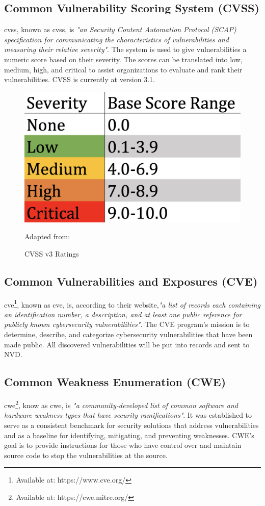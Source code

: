 \subsection{Common Vulnerability Scoring System (CVSS)}
\acrlong{cvss}, known as \acrshort{cvss}, is \textit{"an Security Content Automation Protocol (SCAP) specification for communicating the characteristics of vulnerabilities and measuring their relative severity"}\cite{nistCVSS}. The system is used to give vulnerabilities a numeric score based on their severity. The scores can be translated into low, medium, high, and critical to assist organizations to evaluate and rank their vulnerabilities. CVSS is currently at version 3.1. \cite{CVSS}
\begin{figure}[H]
    \centering
    \includegraphics[scale=0.3]{Images/CVSS.png}
    \caption{CVSS v3 Ratings} Adapted from:\cite{cvssrating}
    \label{fig:CVSS v3 Ratings}
\end{figure}


\subsection{Common Vulnerabilities and Exposures (CVE)}
\acrlong{cve}\footnote{Available at: https://www.cve.org/}, known as \acrshort{cve}, is, according to their website,\textit{"a list of records each containing an identification number, a description, and at least one public reference for publicly known cybersecurity vulnerabilities"}\cite{CVE}. The CVE program's mission is to determine, describe, and categorize cybersecurity vulnerabilities that have been made public. All discovered vulnerabilities will be put into records and sent to NVD.

\subsection{Common Weakness Enumeration (CWE)}
\label{cwe}
\acrlong{cwe}\footnote{Available at: https://cwe.mitre.org/}, know as \acrshort{cwe}, is \textit{"a community-developed list of common software and hardware weakness types that have security ramifications"}\cite{CWE}. It was established to serve as a consistent benchmark for security solutions that address vulnerabilities and as a baseline for identifying, mitigating, and preventing weaknesses. CWE's goal is to provide instructions for those who have control over and maintain source code to stop the vulnerabilities at the source. 

